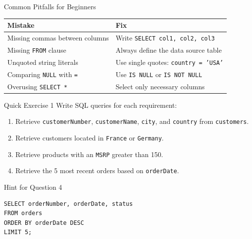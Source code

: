 \documentclass[aspectratio=169,11pt]{beamer}
\newcommand{\kw}[1]{\textcolor{sqlblue}{\texttt{#1}}}
\begin{document}
\begin{frame}{Common Pitfalls for Beginners}
\begin{center}
\begin{tabular}{>{\raggedright\arraybackslash}p{}>{\raggedright\arraybackslash}p{}}
\toprule
\textbf{Mistake} & \textbf{Fix} \\
\midrule
Missing commas between columns & Write \texttt{SELECT col1, col2, col3} \\
Missing \kw{FROM} clause & Always define the data source table \\
Unquoted string literals & Use single quotes: \texttt{country = 'USA'} \\
Comparing \kw{NULL} with \texttt{=} & Use \kw{IS NULL} or \kw{IS NOT NULL} \\
Overusing \kw{SELECT *} & Select only necessary columns \\
\bottomrule
\end{tabular}
\end{center}
\end{frame}

\begin{frame}[fragile]{Quick Exercise 1}
Write SQL queries for each requirement:
\begin{enumerate}
  \item Retrieve \texttt{customerNumber}, \texttt{customerName}, \texttt{city}, and \texttt{country} from \texttt{customers}.
  \item Retrieve customers located in \texttt{France} or \texttt{Germany}.
  \item Retrieve products with an \texttt{MSRP} greater than 150.
  \item Retrieve the 5 most recent orders based on \texttt{orderDate}.
\end{enumerate}
\pause
\begin{block}{Hint for Question 4}
\begin{lstlisting}
SELECT orderNumber, orderDate, status
FROM orders
ORDER BY orderDate DESC
LIMIT 5;
\end{lstlisting}
\end{block}
\end{frame}
\end{document}
